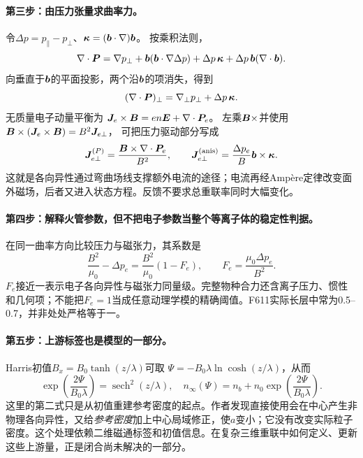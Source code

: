 \documentclass[UTF8,a4paper,11pt,openany,fontset=fandol]{ctexbook}
\begin{document}
\paragraph{第三步：由压力张量求曲率力。}
令$\Delta p=p_\parallel-p_\perp$、$\bm{\kappa}=(\bm{b}\cdot\nabla)\bm{b}$。
按乘积法则，
\begin{equation}
\nabla\cdot\bm{P}
=\nabla p_\perp+\bm{b}(\bm{b}\cdot\nabla\Delta p)
 +\Delta p\,\bm{\kappa}+\Delta p\,\bm{b}(\nabla\cdot\bm{b}).
\end{equation}
向垂直于$\bm{b}$的平面投影，两个沿$\bm{b}$的项消失，得到
\begin{equation}
(\nabla\cdot\bm{P})_\perp=\nabla_\perp p_\perp+\Delta p\,\bm{\kappa} .
\end{equation}
无质量电子动量平衡为
$\bm{J}_e\times\bm{B}=en\bm{E}+\nabla\cdot\bm{P}_e$。
左乘$\bm{B}\times$并使用
$\bm{B}\times(\bm{J}_e\times\bm{B})=B^2\bm{J}_{e\perp}$，
可把压力驱动部分写成
\begin{equation}
\bm{J}_{e\perp}^{(P)}
=\frac{\bm{B}\times\nabla\cdot\bm{P}_e}{B^2},\qquad
\bm{J}_{e\perp}^{(\mathrm{anis})}
=\frac{\Delta p_e}{B}\bm{b}\times\bm{\kappa} .
\end{equation}
这就是各向异性通过弯曲场线支撑额外电流的途径；电流再经Ampère定律改变面外磁场，后者又进入状态方程。反馈不要求总重联率同时大幅变化。

\paragraph{第四步：解释火管参数，但不把电子参数当整个等离子体的稳定性判据。}
在同一曲率方向比较压力与磁张力，其系数是
\begin{equation}
\frac{B^2}{\mu_0}-\Delta p_e
=\frac{B^2}{\mu_0}(1-F_e),\qquad
F_e=\frac{\mu_0\Delta p_e}{B^2}.
\end{equation}
$F_e$接近一表示电子各向异性与磁张力同量级。完整物种合力还含离子压力、惯性和几何项；不能把$F_e=1$当成任意动理学模的精确阈值。F611实际长层中常为0.5--0.7，并非处处严格等于一。

\paragraph{第五步：上游标签也是模型的一部分。}
Harris初值$B_x=B_0\tanh(z/\lambda)$可取
$\Psi=-B_0\lambda\ln\cosh(z/\lambda)$，从而
\begin{equation}
\exp\!\left(\frac{2\Psi}{B_0\lambda}\right)
=\operatorname{sech}^2(z/\lambda),\quad
n_\infty(\Psi)=n_b+n_0\exp\!\left(\frac{2\Psi}{B_0\lambda}\right).
\end{equation}
这里的第二式只是从初值重建参考密度的起点。作者发现直接使用会在中心产生非物理各向异性，又给\emph{参考密度}加上中心局域修正，使$a$变小；它没有改变实际粒子密度。这个处理依赖二维磁通标签和初值信息。在复杂三维重联中如何定义、更新这些上游量，正是闭合尚未解决的一部分。
\end{document}
